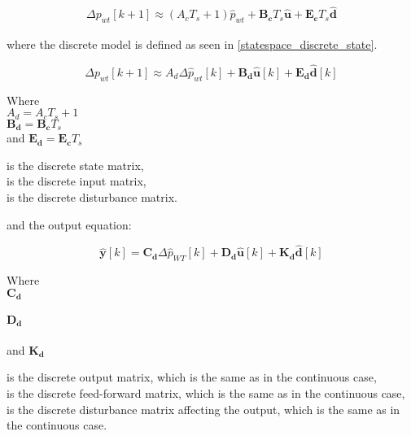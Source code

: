 \begin{equation}
  \begin{split}
  \Delta p_{wt}[k+1] \approx (A_cT_s+1)\hat{p}_{wt}+\bm{B_c}T_s \bm{\hat{u}}+\bm{E_c} T_s \bm{\hat{d}}
  \end{split}
  \label{eq:dist_statespace_forward_euler}
\end{equation}

where the discrete model is defined as seen in \eqref{statespace_discrete_state}.

\begin{equation}
\Delta p_{wt}[k+1] \approx A_d \Delta \hat{p}_{wt}[k]  + \bm{B_d} \bm{\hat{u}}[k] + \bm{E_d} \bm{\hat{d}}[k] 
 \label{statespace_discrete_state}
\end{equation}

\begin{minipage}[h]{0.25\textwidth}
Where\\
\hspace*{8mm} $A_d = A_cT_s+1 $\\
\hspace*{8mm} $\bm{B_d} = \bm{B_c}T_s$\\
and \hspace*{0.7mm} $\bm{E_d} = \bm{E_c}T_s$
\end{minipage}
\begin{minipage}[h]{0.73\textwidth}
\vspace*{2.5mm}
is the discrete state matrix, \\
is the discrete input matrix, \\
is the discrete disturbance matrix. 
\end{minipage}


and the output equation:

\begin{equation}
  \bm{\hat{y}}[k] = \bm{C_d} \Delta \hat{p}_{WT}[k] + \bm{D_d} \bm{\hat{u}}[k] + \bm{K_d} \bm{\hat{d}}[k]
\label{statespace_control_output_discrete}
\end{equation}

\begin{minipage}[t]{0.20\textwidth}
Where\\
\hspace*{8mm} $\bm{C_d}$ \\\\
\hspace*{8mm} $\bm{D_d}$ \\\\
and \hspace*{0.7mm} $\bm{K_d}$ 
\end{minipage}
\begin{minipage}[t]{0.78\textwidth}
\vspace*{2mm}
is the discrete output matrix, which is the same as in the continuous case, \\
is the discrete feed-forward matrix, which is the same as in the continuous case, \\
is the discrete disturbance matrix affecting the output, which is the same as in the continuous case. \\
\end{minipage}



